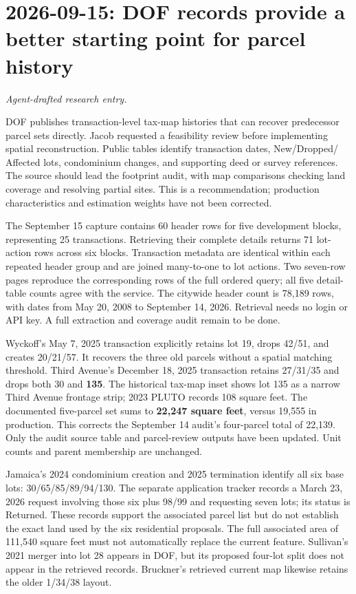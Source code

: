 \clearpage
\section*{2026-09-15: DOF records provide a better starting point for parcel history}
\textit{Agent-drafted research entry.}

DOF publishes transaction-level tax-map histories that can recover predecessor
parcel sets directly. Jacob requested a feasibility review before implementing
spatial reconstruction. Public tables identify transaction dates, New/Dropped/
Affected lots, condominium changes, and supporting deed or survey references.
The source should lead the footprint audit, with map comparisons checking land
coverage and resolving partial sites. This is a recommendation; production
characteristics and estimation weights have not been corrected.

The September 15 capture contains 60 header rows for five development blocks,
representing 25 transactions. Retrieving their complete details returns 71
lot-action rows across six blocks. Transaction metadata are identical within
each repeated header group and are joined many-to-one to lot actions. Two
seven-row pages reproduce the corresponding rows of the full ordered query;
all five detail-table counts agree with the service. The citywide header count
is 78,189 rows, with dates from May 20, 2008 to September 14, 2026. Retrieval
needs no login or API key. A full extraction and coverage audit remain to be done.

Wyckoff's May 7, 2025 transaction explicitly retains lot 19, drops 42/51,
and creates 20/21/57. It recovers the three old parcels without a spatial
matching threshold. Third Avenue's December 18, 2025 transaction retains
27/31/35 and drops both 30 and \textbf{135}. The historical tax-map inset
shows lot 135 as a narrow Third Avenue frontage strip; 2023 PLUTO records
108 square feet. The documented five-parcel set sums to \textbf{22,247 square
feet}, versus 19,555 in production. This corrects the September 14 audit's
four-parcel total of 22,139. Only the audit source table and parcel-review
outputs have been updated. Unit counts and parent membership are unchanged.

Jamaica's 2024 condominium creation and 2025 termination identify all six
base lots: 30/65/85/89/94/130. The separate application tracker records a
March 23, 2026 request involving those six plus 98/99 and requesting seven
lots; its status is Returned. These records support the associated parcel
list but do not establish the exact land used by the six residential proposals.
The full associated area of 111,540 square feet must not automatically replace
the current feature. Sullivan's 2021 merger into lot 28 appears in DOF, but
its proposed four-lot split does not appear in the retrieved records.
Bruckner's retrieved current map likewise retains the older 1/34/38 layout.

